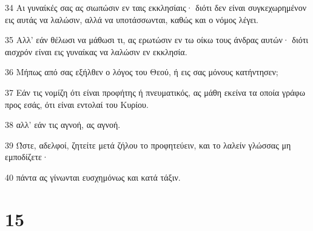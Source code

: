 \par 34 Αι γυναίκές σας ας σιωπώσιν εν ταις εκκλησίαις· διότι δεν είναι συγκεχωρημένον εις αυτάς να λαλώσιν, αλλά να υποτάσσωνται, καθώς και ο νόμος λέγει.
\par 35 Αλλ' εάν θέλωσι να μάθωσι τι, ας ερωτώσιν εν τω οίκω τους άνδρας αυτών· διότι αισχρόν είναι εις γυναίκας να λαλώσιν εν εκκλησία.
\par 36 Μήπως από σας εξήλθεν ο λόγος του Θεού, ή εις σας μόνους κατήντησεν;
\par 37 Εάν τις νομίζη ότι είναι προφήτης ή πνευματικός, ας μάθη εκείνα τα οποία γράφω προς εσάς, ότι είναι εντολαί του Κυρίου.
\par 38 αλλ' εάν τις αγνοή, ας αγνοή.
\par 39 Ώστε, αδελφοί, ζητείτε μετά ζήλου το προφητεύειν, και το λαλείν γλώσσας μη εμποδίζετε·
\par 40 πάντα ας γίνωνται ευσχημόνως και κατά τάξιν.

\chapter{15}

